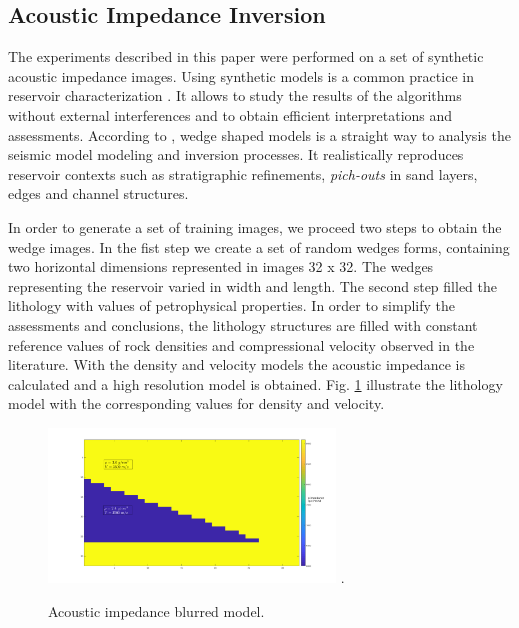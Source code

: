 \documentclass[conference,compsoc]{IEEEtran}
\begin{document}
\subsection{Acoustic Impedance Inversion}
The experiments described in this paper were performed
on a set of synthetic acoustic impedance images. Using synthetic models
is a common practice in reservoir characterization \cite{}. It allows to study the
results of the algorithms without external interferences and to obtain
efficient interpretations and assessments. 
According to \cite{Harvey}, wedge shaped models is a straight way to analysis the
seismic model modeling and inversion processes. It realistically reproduces
reservoir contexts such as stratigraphic refinements, \textit{pich-outs} in sand layers, 
edges and channel structures.

In order to generate a set of training images, we proceed two steps to obtain the wedge images.
In the fist step we create a set of random wedges forms, containing two horizontal dimensions represented in images 32 x 32.
The wedges representing the reservoir varied in width and length. The second step
filled the lithology with values of petrophysical properties. In order to simplify
the assessments and conclusions, the lithology structures are filled with constant
reference values of rock densities and compressional velocity observed in the literature.
With the density and velocity models the acoustic impedance is calculated and a high
resolution model is obtained. Fig. \ref{fig_lithology} illustrate the lithology
model with the corresponding values for density and velocity.
\begin{figure}[!t]
\centering
\includegraphics[width=3.0in]{Image_Paper}
\DeclareGraphicsExtensions.
\caption{Acoustic impedance blurred model.}
\label{fig_lithology}
\end{figure}
\end{document}
